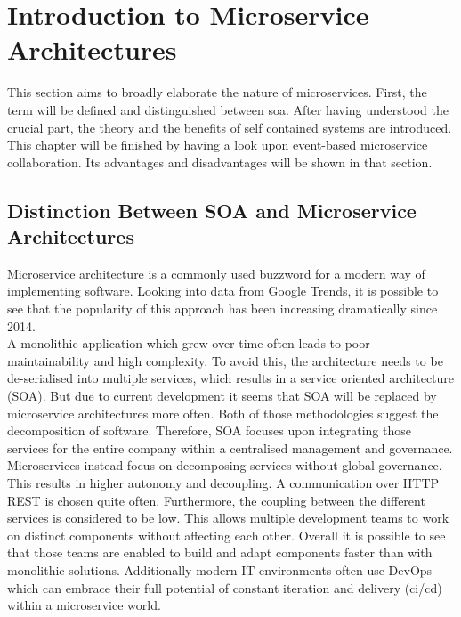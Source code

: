 \section{Introduction to Microservice  Architectures}
\label{sec:techKnowHow}
This section aims to broadly elaborate the nature of microservices. First, the term will be defined and distinguished between \acrfull{soa}. After having understood the crucial part, the theory and the benefits of self contained systems are introduced. This chapter will be finished by having a look upon event-based microservice  collaboration. Its advantages and disadvantages will be shown in that section. 

\subsection{Distinction Between SOA and Microservice Architectures}
Microservice architecture is a commonly used buzzword for a modern way of implementing software. Looking into data from Google Trends, it is possible to see that the popularity of this approach has been increasing dramatically since 2014. \cite{microservices}\newline
\\
A monolithic application which grew over time often leads to poor maintainability and high complexity. To avoid this, the architecture needs to be de-serialised into multiple services, which results in a service oriented architecture (SOA). But due to current development it seems that SOA will be replaced by microservice architectures more often.\cite{mircorVSsoa}\newline
Both of those methodologies suggest the decomposition of software. Therefore, SOA focuses upon integrating those services for the entire company within a centralised management and governance. Microservices instead focus on decomposing services without global governance. This results in higher autonomy and decoupling. \cite{mircorVSsoa} A communication over HTTP REST is chosen quite often.\newline
Furthermore, the coupling between the different services is considered to be low. This allows multiple development teams to work on distinct components without affecting each other. Overall it is possible to see that those teams are enabled to build and adapt components faster than with monolithic solutions. Additionally  modern IT environments often use DevOps which can embrace their full potential of constant iteration and delivery (\acrshort{ci/cd}) within a microservice  world. \cite{redHatMicroservices}\newline

